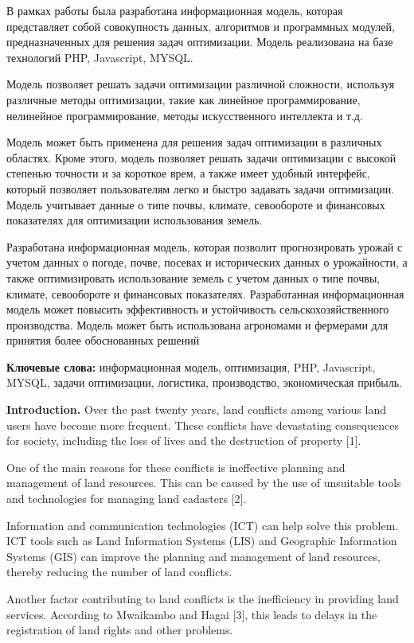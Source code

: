 В рамках работы была разработана информационная модель, которая
представляет собой совокупность данных, алгоритмов и программных
модулей, предназначенных для решения задач оптимизации. Модель
реализована на базе технологий PHP, Javascript, MYSQL.

Модель позволяет решать задачи оптимизации различной сложности,
используя различные методы оптимизации, такие как линейное
программирование, нелинейное программирование, методы искусственного
интеллекта и т.д.

Модель может быть применена для решения задач оптимизации в различных
областях. Кроме этого, модель позволяет решать задачи оптимизации с
высокой степенью точности и за короткое врем, а также имеет удобный
интерфейс, который позволяет пользователям легко и быстро задавать
задачи оптимизации. Модель учитывает данные о типе почвы, климате,
севообороте и финансовых показателях для оптимизации использования
земель.

Разработана информационная модель, которая позволит прогнозировать
урожай с учетом данных о погоде, почве, посевах и исторических данных о
урожайности, а также оптимизировать использование земель с учетом данных
о типе почвы, климате, севообороте и финансовых показателях.
Разработанная информационная модель может повысить эффективность и
устойчивость сельскохозяйственного производства. Модель может быть
использована агрономами и фермерами для принятия более обоснованных
решений

{\bfseries Ключевые слова:} информационная модель, оптимизация, PHP,
Javascript, MYSQL, задачи оптимизации, логистика, производство,
экономическая прибыль.

{\bfseries Introduction.} Over the past twenty years, land conflicts among
various land users have become more frequent. These conflicts have
devastating consequences for society, including the loss of lives and
the destruction of property {[}1{]}.

One of the main reasons for these conflicts is ineffective planning and
management of land resources. This can be caused by the use of
unsuitable tools and technologies for managing land cadasters {[}2{]}.

Information and communication technologies (ICT) can help solve this
problem. ICT tools such as Land Information Systems (LIS) and Geographic
Information Systems (GIS) can improve the planning and management of
land resources, thereby reducing the number of land conflicts.

Another factor contributing to land conflicts is the inefficiency in
providing land services. According to Mwaikambo and Hagai {[}3{]}, this
leads to delays in the registration of land rights and other problems.

